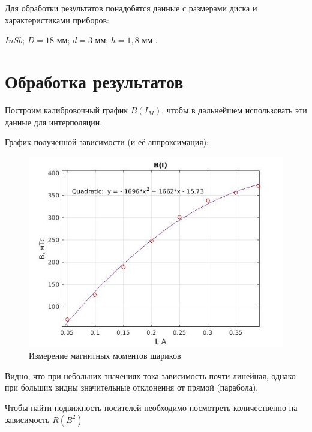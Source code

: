 \documentclass[a4paper, 12pt]{article}%
\begin{document}
Для обработки результатов понадобятся данные с размерами диска и характеристиками приборов:

$InSb$; $D = 18\text{ мм}$; $d = 3\text{ мм}$; $h = 1,8\text{ мм}$ .





\section{Обработка результатов}

Построим калибровочный график $B(I_M)$, чтобы в дальнейшем использовать эти данные для интерполяции.


График полученной зависимости (и её аппроксимация):

\newpage

\begin{center}
\begin{figure}[h]
    \centering
    \includegraphics[width = 10 cm]{B(I).jpg}
    \caption{Измерение магнитных моментов шариков}
    \label{msh1}
\end{figure}
\end{center}

Видно, что при небольних значениях тока зависимость почти линейная, однако при больших видны значительные отклонения от прямой (парабола). 

Чтобы найти подвижность носителей необходимо посмотреть количественно на зависимость $R(B^2)$
\end{document}
